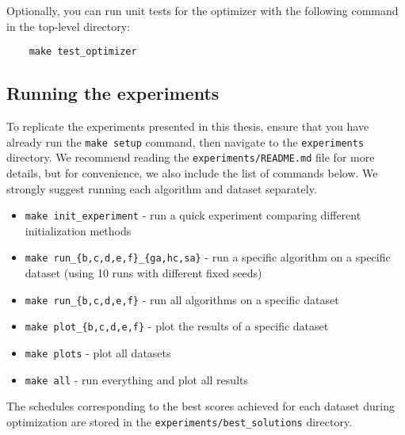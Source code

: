 \bigskip

Optionally, you can run unit tests for the optimizer with the following command in the top-level directory:
\begin{verbatim}
    make test_optimizer
\end{verbatim}

\subsection{Running the experiments}

To replicate the experiments presented in this thesis, ensure that you have already run the \verb|make setup| command, then navigate to the \verb|experiments| directory. We recommend reading the \verb|experiments/README.md| file for more details, but for convenience, we also include the list of commands below. We strongly suggest running each algorithm and dataset separately.
\begin{itemize}
    \item \verb|make init_experiment| - run a quick experiment comparing different initialization methods
    \item \verb|make run_{b,c,d,e,f}_{ga,hc,sa}| - run a specific algorithm on a specific dataset (using 10 runs with different fixed seeds)
    \item \verb|make run_{b,c,d,e,f}| - run all algorithms on a specific dataset
    \item \verb|make plot_{b,c,d,e,f}| - plot the results of a specific dataset
    \item \verb|make plots| - plot all datasets
    \item \verb|make all| - run everything and plot all results
\end{itemize}

The schedules corresponding to the best scores
achieved for each dataset during optimization are stored in the \verb|experiments/best_solutions| directory.
